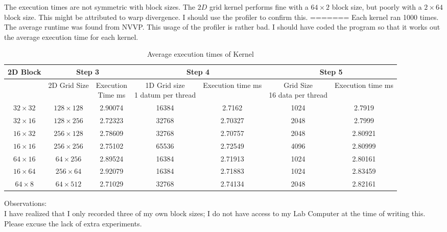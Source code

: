 \documentclass[a4paper,12pt]{article}
\begin{document}
  The execution times are not symmetric with block sizes.
  The $2D$ grid kernel performs fine with a $64 \times 2$ block size, but poorly with a $2 \times 64$ block size.
  This might be attributed to warp divergence.
  I should use the profiler to confirm this.
=======
Each kernel ran 1000 times. 
The average runtime was found from NVVP.
This usage of the profiler is rather bad.
I should have coded the program so that it works out the average execution time for each kernel.
\begin{table}[!h]
  \centering
  \begin{tabular}{|c|c|c|c|c|c|c|}
    \hline
    \textbf{2D Block} & \multicolumn{2}{c|}{\textbf{Step 3}} & \multicolumn{2}{c|}{\textbf{Step 4}} & \multicolumn{2}{c|}{\textbf{Step 5}}  \\ \hline
             & 2D Grid Size& \multicolumn{1}{p{5em}|}{Execution \newline Time ms} & \multicolumn{1}{p{5.5em}|}{1D Grid size\newline 1 datum per thread} & \multicolumn{1}{p{5.5em}|}{Execution time ms}&\multicolumn{1}{p{5em}|}{Grid Size\newline 16 data per thread} & \multicolumn{1}{p{5em}|}{Execution time ms} \\ \hline
    $32 \times 32$ & $128 \times 128$ & 2.90074 & 16384 & 2.7162 & 1024 & 2.7919 \\ \hline
    $32 \times 16$ & $128 \times 256$ & 2.72323 & 32768 & 2.70327 & 2048 & 2.7999 \\ \hline
    $16 \times 32$ & $256 \times 128$ & 2.78609 & 32768 & 2.70757 & 2048 & 2.80921 \\ \hline
    $16 \times 16$ & $256 \times 256$ & 2.75102 & 65536 & 2.72549 & 4096 & 2.80999 \\ \hline
    $64 \times 16$ & $64  \times 256$ & 2.89524 & 16384 & 2.71913 & 1024 & 2.80161 \\ \hline
    $16 \times 64$ & $256 \times 64 $ & 2.92079 & 16384 & 2.71883 & 1024 & 2.83459 \\ \hline
    $64 \times  8$ & $64  \times 512$ & 2.71029 & 32768 & 2.74134 & 2048 & 2.82161 \\ \hline
  \end{tabular}
  \caption{Average execution times of Kernel}
  \label{table2}
\end{table}
Observations:\\
I have realized that I only recorded three of my own block sizes; I do not have access to my Lab Computer at the time of writing this.
Please excuse the lack of extra experiments.
\end{document}
